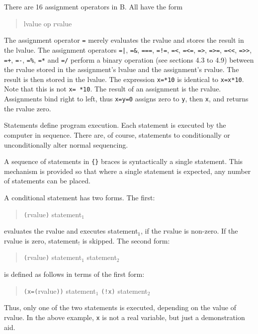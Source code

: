 \documentclass[12pt]{report}
\begin{document}

There are 16 assignment operators in B. All have the form
\begin{quote}
  lvalue op rvalue
\end{quote}
The assignment operator \verb|=| merely evaluates the rvalue and
stores the result in the lvalue.  The assignment operators \verb$=|$,
\verb|=&|, \verb|===|, \verb|=!=|, \verb|=<|, \verb|=<=|, \verb|=>|,
\verb|=>=|, \verb|=<<|, \verb|=>>|, \verb|=+|, \verb|=-|, \verb|=%|,
\verb|=*| and \verb|=/| perform a binary operation (see sections 4.3
to 4.9) between the rvalue stored in the assignment's lvalue and the
assignment's rvalue. The result is then stored in the lvalue. The
expression \verb|x=*10| is identical to \verb|x=x*10|. Note that this
is not \verb|x= *10|. The result of an assignment is the
rvalue. Assignments bind right to left, thus \verb|x=y=0| assigns zero
to \verb|y|, then \verb|x|, and returns the rvalue zero.


Statements define program execution. Each statement is executed by the
computer in sequence. There are, of course, statements to
conditionally or unconditionally alter normal sequencing.


A sequence of statements in \verb|{}| braces is syntactically a single
statement. This mechanism is provided so that where a single statement
is expected, any number of statements can be placed.


A conditional statement has two forms. The first:
\begin{quote}
  \verb|(|rvalue\verb|)| statement$_1$
\end{quote}
evaluates the rvalue and executes statement$_1$, if the rvalue is
non-zero. If the rvalue is zero, statement$_!$ is skipped. The second
form:
\begin{quote}
  \verb|(|rvalue\verb|)| statement$_1$  statement$_2$
\end{quote}
is defined as follows in terms of the first form:
\begin{quote}
  \verb|(x=(|rvalue\verb|))| statement$_1$ \verb|(!x)| statement$_2$
\end{quote}
Thus, only one of the two statements is executed, depending on the
value of rvalue. In the above example, \verb|x| is not a real variable, but
just a demonstration aid.
\end{document}
